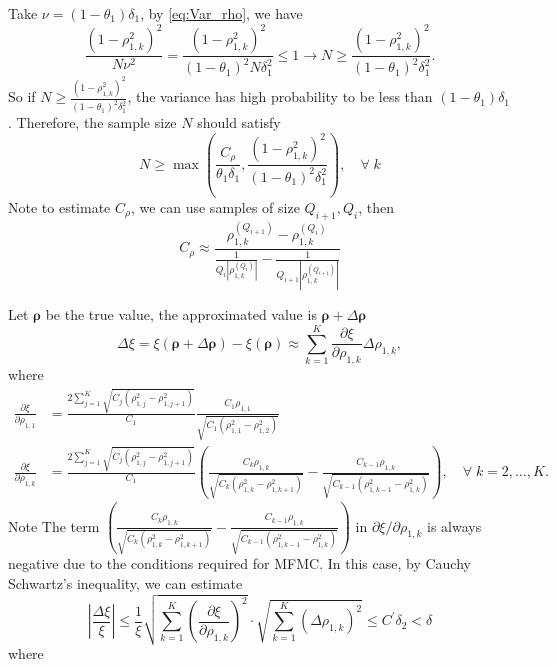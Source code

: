Take $\nu = (1-\theta_1)\delta_1$, by \eqref{eq:Var_rho}, we have
\[
\frac{(1-\rho_{1,k}^2)^2}{N\nu^2} = \frac{(1-\rho_{1,k}^2)^2}{(1-\theta_1)^2N\delta_1^2}\le 1\rightarrow N\ge \frac{(1-\rho_{1,k}^2)^2}{(1-\theta_1)^2\delta_1^2}.
\]
So if $N\ge \frac{(1-\rho_{1,k}^2)^2}{(1-\theta_1)^2\delta_1^2}$, the variance has high probability to be less than $(1-\theta_1)\delta_1$. Therefore, the sample size $N$ should satisfy
\begin{equation}
\label{eq:Offline_Sample_Size}
    N\ge \max \left(\frac{C_\rho}{\theta_1\delta_1 }, \frac{(1-\rho_{1,k}^2)^2}{(1-\theta_1)^2\delta_1^2}\right), \quad \forall \;k
\end{equation}
Note to estimate $C_\rho$, we can use samples of size $Q_{i+1},Q_i$, then 
\[
C_\rho\approx \frac{\rho_{1,k}^{(Q_{i+1})} - \rho_{1,k}^{(Q_i)}}{\frac{1}{Q_i\left|\rho_{1,k}^{(Q_i)}\right|} - \frac{1}{Q_{i+1}\left|\rho_{1,k}^{(Q_{i+1})}\right|} }
\]

Let $\boldsymbol{\rho}$ be the true value, the approximated value is $\boldsymbol{\rho}+\Delta \boldsymbol{\rho}$
\[
\Delta\xi=\xi(\boldsymbol{\rho}+\Delta \boldsymbol{\rho}) - \xi(\boldsymbol{\rho}) \approx \sum_{k=1}^K \frac{\partial \xi}{\partial \rho_{1,k}} \Delta\rho_{1,k},
\]
where
%
\begin{align*}
\frac{\partial  \xi}{\partial  \rho_{1,1}} &=\frac{2\sum_{j=1}^K\sqrt{C_j\left(\rho_{1,j}^2 - \rho_{1,j+1}^2\right)}}{C_1}\frac{C_1\rho_{1,1}}{\sqrt{C_1(\rho_{1,1}^2-\rho_{1,2}^2)  }}\\
    \frac{\partial  \xi}{\partial  \rho_{1,k}} &=\frac{2\sum_{j=1}^K\sqrt{C_j\left(\rho_{1,j}^2 - \rho_{1,j+1}^2\right)}}{C_1}\left(\frac{C_k\rho_{1,k}}{\sqrt{C_k(\rho_{1,k}^2-\rho_{1,k+1}^2)}}-\frac{C_{k-1}\rho_{1,k}}{\sqrt{C_{k-1}(\rho_{1,k-1}^2-\rho_{1,k}^2)}}\right), \quad \forall\; k=2,\ldots, K.
\end{align*}
%
Note The term $\left(\frac{C_k\rho_{1,k}}{\sqrt{C_k(\rho_{1,k}^2-\rho_{1,k+1}^2)}}-\frac{C_{k-1}\rho_{1,k}}{\sqrt{C_{k-1}(\rho_{1,k-1}^2-\rho_{1,k}^2)}}\right)$ in $\partial \xi/\partial \rho_{1,k}$ is always negative due to the conditions required for MFMC. In this case, by Cauchy Schwartz's inequality, we can estimate
\[
\left|\frac{\Delta \xi}{\xi}\right|\le \frac{1}{\xi}\sqrt{\sum_{k=1}^K \left(\frac{\partial \xi}{\partial \rho_{1,k}}\right)^2}\cdot \sqrt{\sum_{k=1}^K\left(\Delta\rho_{1,k}\right)^2}\le C^\prime \delta_2<\delta
\]
where 

